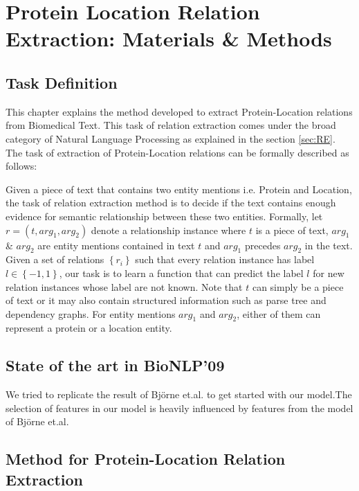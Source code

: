 \chapter{Protein Location Relation Extraction: Materials \& Methods}\label{chapter:methods}
\newcommand*{\xml}[1]{\texttt{<#1>}}
\section{Task Definition}

This chapter explains the method developed to extract Protein-Location relations from Biomedical Text. This task of relation extraction comes under the broad category of Natural Language Processing as explained in the section \ref{sec:RE}. The task of extraction of Protein-Location relations can be formally described as follows:

Given a piece of text that contains two entity mentions i.e. Protein and Location, the task of relation extraction method is to decide if the text contains enough evidence for semantic relationship between these two entities. Formally, let $r=(t,arg_1,arg_2)$ denote a relationship instance where $t$ is a piece of text, $arg_1$ \& $arg_2$  are entity mentions contained in text $t$ and $arg_1$ precedes $arg_2$ in the text. Given a set of relations $\left\lbrace r_i \right\rbrace$ such that every relation instance has label $l \in \left\lbrace-1,1\right\rbrace$, our task is to learn a function that can predict the label $l$ for new relation instances whose label are not known. Note that $t$ can simply be a piece of text or it may also contain structured information such as parse tree and dependency graphs. For entity mentions $arg_1$ and $arg_2$, either of them can represent a protein or a location entity.
 
\section{State of the art in BioNLP'09}

We tried to replicate the result of Björne et.al. to get started with our model.The selection of features in our model is heavily influenced by features from the model of Björne et.al.

\section{Method for Protein-Location Relation Extraction}


